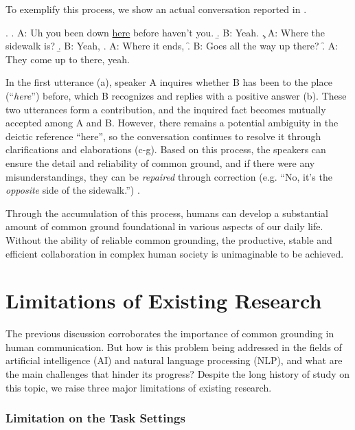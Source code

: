 To exemplify this process, we show an actual conversation reported in \citet{Sacks1974ASS}.

\ex. \label{ex_1:deictic_reference}
\a. A:\; Uh you been down \underline{here} before haven't you.
\b. B:\; Yeah.
\c. A:\; Where the sidewalk is?
\b. B:\; Yeah,
\e. A:\; Where it ends,
\f. B:\; Goes all the way up there?
\f. A:\; They come up to there, yeah.

In the first utterance (a), speaker A inquires whether B has been to the place (``\textit{here}'') before, which B recognizes and replies with a positive answer (b). These two utterances form a contribution, and the inquired fact becomes mutually accepted among A and B. However, there remains a potential ambiguity in the deictic reference ``here'', so the conversation continues to resolve it through clarifications and elaborations (c-g). Based on this process, the speakers can ensure the detail and reliability of common ground, and if there were any misunderstandings, they can be \textit{repaired} through correction (e.g. ``No, it's the \textit{opposite} side of the sidewalk.'') \citep{schegloff1977preference}.

Through the accumulation of this process, humans can develop a substantial amount of common ground foundational in various aspects of our daily life. Without the ability of reliable common grounding, the productive, stable and efficient collaboration in complex human society is unimaginable to be achieved.


\section{Limitations of Existing Research}
\label{01_sec:existing_research}

The previous discussion corroborates the importance of common grounding in human communication. But how is this problem being addressed in the fields of artificial intelligence (AI) and natural language processing (NLP), and what are the main challenges that hinder its progress? Despite the long history of study on this topic, we raise three major limitations of existing research.

\subsubsection{Limitation on the Task Settings}

